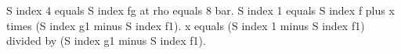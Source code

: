 S index 4 equals S index fg at rho equals 8 bar.
S index 1 equals S index f plus x times (S index g1 minus S index f1).
x equals (S index 1 minus S index f1) divided by (S index g1 minus S index f1).